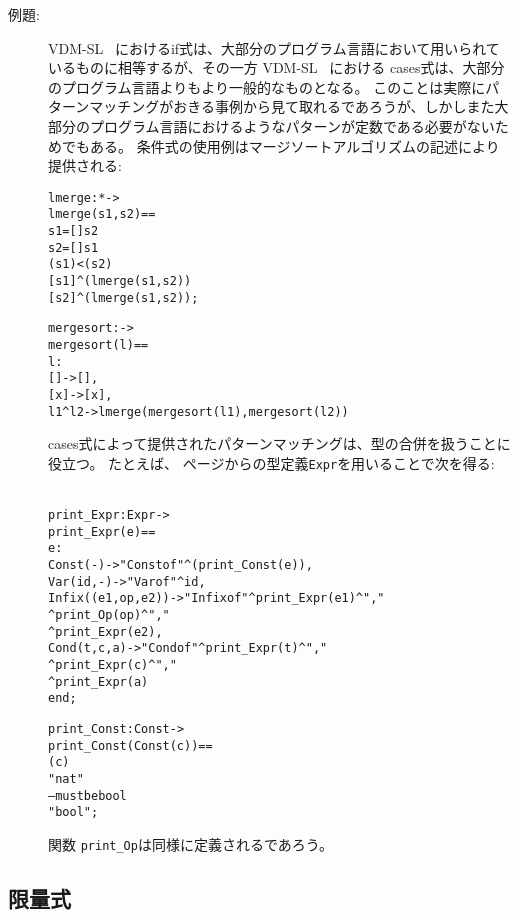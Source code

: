 \documentclass[\pformat,12pt]{jarticle}
\newcommand{\vdmslpp}[2]{%
#1
}
\newcommand{\vdmsl}{VDM-SL}
\newcommand{\vdmpp}{VDM++}
\begin{document}
\begin{description}
\item[例題:] 
 \vdmslpp{\vdmsl}{\vdmpp}\ におけるif式は、大部分のプログラム言語において用いられているものに相等するが、その一方 \vdmslpp{\vdmsl}{\vdmpp}\ における cases式は、大部分のプログラム言語よりもより一般的なものとなる。
このことは実際にパターンマッチングがおきる事例から見て取れるであろうが、しかしまた大部分のプログラム言語におけるようなパターンが定数である必要がないためでもある。
  条件式の使用例はマージソートアルゴリズムの記述により提供される:
  \begin{alltt}
  lmerge :  *  -> 
  lmerge (s1,s2) ==
     s1 = []  s2
     s2 = []  s1
     ( s1) < ( s2)
     [ s1]\verb+^+(lmerge ( s1, s2))
     [ s2]\verb+^+(lmerge (s1,  s2));

  mergesort :  -> 
  mergesort (l) ==
     l:
      [] -> [],
      [x] -> [x],
      l1\verb+^+l2 -> lmerge (mergesort(l1), mergesort(l2))
  \end{alltt}
cases式によって提供されたパターンマッチングは、型の合併を扱うことに役立つ。
たとえば、\pageref{exprdef} ページからの型定義\texttt{Expr}を用いることで次を得る:
  \begin{alltt}\label{printExprDef}
  print_Expr : Expr -> 
  print_Expr (e) ==
     e:
      Const(-) -> "Const of"\verb+^+(print_Const(e)),
      Var(id,-) -> "Var of"\verb+^+id,
      Infix((e1,op,e2)) -> "Infix of"\verb+^+print_Expr(e1)^","
                                      \verb+^+print_Op(op)\verb+^+","
                                      \verb+^+print_Expr(e2),
      Cond(t,c,a) -> "Cond of"\verb+^+print_Expr(t)\verb+^+","
                                 \verb+^+print_Expr(c)\verb+^+","
                                 \verb+^+print_Expr(a)
    end;

  print_Const : Const -> 
  print_Const(Const(c)) ==
     (c)
     "nat"
     -- must be bool
         "bool";
  \end{alltt}
  関数 \texttt{print\_Op}は同様に定義されるであろう。
\end{description}

\subsection{限量式}
\end{document}
